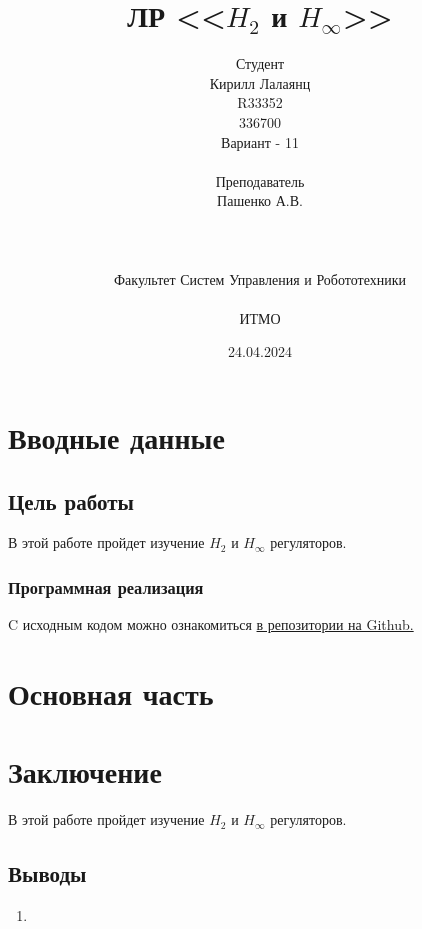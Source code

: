 \documentclass[16pt]{article}
\title{ЛР \textnumero 11 <<\(H_2\) и \(H_\infty\)>>}
\author{
Студент \\
Кирилл Лалаянц\\
R33352\\
336700\\
Вариант - 11\\
\\
Преподаватель\\
Пашенко А.В. \\
\\
\\
\\
Факультет Систем Управления и Робототехники\\
\\
ИТМО\\
}
\date{24.04.2024}
\begin{document}
\maketitle
\newpage
\tableofcontents
\thispagestyle{empty}

\newpage
\setcounter{page}{1}
\section{Вводные данные}
\subsection{Цель работы}
В этой работе пройдет изучение \(H_2\) и \(H_\infty\) регуляторов.

\subsubsection{Программная реализация}
C исходным кодом можно ознакомиться \href{https://github.com/lalayants/control-theory-itmo-2023-2024}{в репозитории на Github.}


\newpage
\section{Основная часть}

\FloatBarrier

% 

% 

% 

% 

\newpage
\section{Заключение}
В этой работе пройдет изучение \(H_2\) и \(H_\infty\) регуляторов.
\subsection{Выводы}
\begin{enumerate}
   \item 
\end{enumerate}
\end{document}
